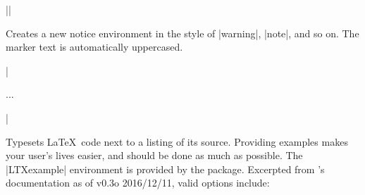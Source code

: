 \documentclass{ltxguidex}
\begin{document}
\begin{desc}
||
\end{desc}

Creates a new notice environment in the style of |warning|, |note|, and so
on. The marker text is automatically uppercased.

\begin{desc}
|\begin{LTXexample}[<options>]...\end{LTXexample}|
\end{desc}

Typesets \LaTeX\ code next to a listing of its source. Providing examples
makes your user's lives easier, and should be done as much as possible. The
|LTXexample| environment is provided by the  package.
Excerpted from 's documentation as of v0.3o 2016/12/11, valid
options include:
\end{document}
